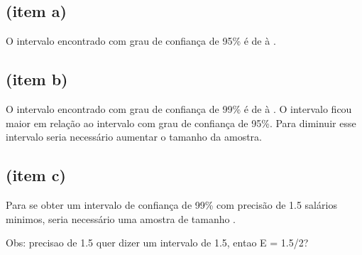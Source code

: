 

\subsection{(item a)}
O intervalo encontrado com grau de confiança de 95\% é de \TRESicmin à \TRESicmax.

\subsection{(item b)}
O intervalo encontrado com grau de confiança de 99\% é de \TRESicNoveNoveMin à \TRESicNoveNoveMax.
O intervalo ficou maior em relação ao intervalo com grau de confiança de 95\%.{}
Para diminuir esse intervalo seria necessário aumentar o tamanho da amostra.

\subsection{(item c)}
Para se obter um intervalo de confiança de 99\% com precisão de 1.5 salários
minimos, seria necessário uma amostra de tamanho \TRESnZero.

Obs: precisao de 1.5 quer dizer um intervalo de 1.5, entao E = 1.5/2?
